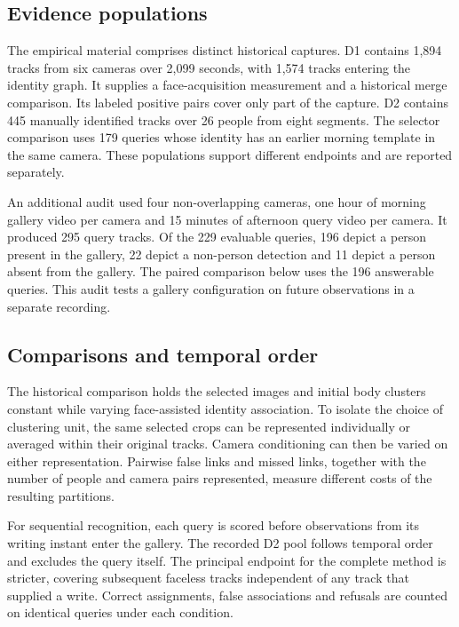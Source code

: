 \documentclass[journal,letterpaper]{IEEEtran}
\newcommand{\draftnote}[3]{\par\smallskip\noindent{\footnotesize
  \textcolor{editink}{\sffamily\bfseries [#2 #1]}\enspace
  \textcolor{editink}{#3}\par}\smallskip}
\newcommand{\expgap}[2]{\draftnote{EXPERIMENT}{#1}{#2}}
\begin{document}
\subsection{Evidence populations}
The empirical material comprises distinct historical captures. D1 contains 1,894 tracks from six cameras over 2,099 seconds, with 1,574 tracks entering the identity graph. It supplies a face-acquisition measurement and a historical merge comparison. Its labeled positive pairs cover only part of the capture. D2 contains 445 manually identified tracks over 26 people from eight segments. The selector comparison uses 179 queries whose identity has an earlier morning template in the same camera. These populations support different endpoints and are reported separately.

An additional audit used four non-overlapping cameras, one hour of morning gallery video per camera and 15 minutes of afternoon query video per camera. It produced 295 query tracks. Of the 229 evaluable queries, 196 depict a person present in the gallery, 22 depict a non-person detection and 11 depict a person absent from the gallery. The paired comparison below uses the 196 answerable queries. This audit tests a gallery configuration on future observations in a separate recording.

\subsection{Comparisons and temporal order}
The historical comparison holds the selected images and initial body clusters constant while varying face-assisted identity association. To isolate the choice of clustering unit, the same selected crops can be represented individually or averaged within their original tracks. Camera conditioning can then be varied on either representation. Pairwise false links and missed links, together with the number of people and camera pairs represented, measure different costs of the resulting partitions.
\expgap{E1}{Compare per-image and eight-frame track features on identical historical images, then ablate camera input and sparse face association with independent identity labels.}

For sequential recognition, each query is scored before observations from its writing instant enter the gallery. The recorded D2 pool follows temporal order and excludes the query itself. The principal endpoint for the complete method is stricter, covering subsequent faceless tracks independent of any track that supplied a write. Correct assignments, false associations and refusals are counted on identical queries under each condition.
\end{document}
